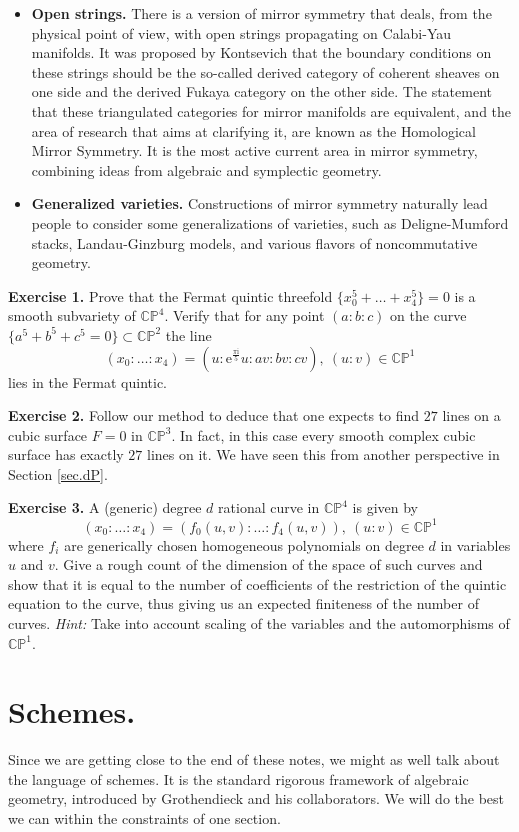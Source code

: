 \documentclass[11pt]{article}
\numberwithin{equation}{section}
\numberwithin{footnote}{section}
\newcommand{\blue}{\color{blue}}
\newcommand{\ee}{{\mathrm e}}
\newcommand{\ii}{{\mathrm i}}
\renewcommand{\P}{{\mathbb P}}
\newcommand{\C}{{\mathbb C}}
\begin{document}
\begin{itemize}
\item{\bf Open strings.} There is a version of mirror symmetry that deals, from the physical point of view, with open strings propagating on Calabi-Yau manifolds. It was proposed by Kontsevich that the boundary conditions on these strings should be the so-called derived category of coherent sheaves on one side and the derived Fukaya category on the other side. The statement that these triangulated categories for mirror manifolds are equivalent, and the area of research that aims at clarifying it, are known as the {\blue Homological Mirror Symmetry}. It is the most active current area in mirror symmetry, combining ideas from algebraic and symplectic geometry.

\item{\bf Generalized varieties.} Constructions of mirror symmetry naturally lead people to consider some generalizations of varieties, such as Deligne-Mumford stacks, Landau-Ginzburg models, and various flavors of noncommutative geometry.
\end{itemize}


{\bf Exercise 1.} Prove that the Fermat quintic threefold $\{x_0^5+ \ldots + x_4^5\}=0$ is a smooth subvariety of $\C\P^4$. Verify
that for any point $(a:b:c)$ on the curve $\{a^5+b^5+c^5 =0\}\subset \C\P^2$ the line
$$
(x_0:\ldots:x_4) = (u: \ee^{\frac {\pi \ii}5} u: a v: b v: cv),~(u:v)\in \C\P^1
$$
lies in the Fermat quintic.

{\bf Exercise 2.} Follow our method to deduce that one expects to find $27$ lines on a cubic surface $F=0$ in $\C\P^3$. In fact, in this case every smooth complex cubic surface has exactly $27$ lines on it. We have seen this from another perspective in Section \ref{sec.dP}.

{\bf Exercise 3.} A (generic) degree $d$ rational curve in $\C\P^4$ is given by 
$$
(x_0:\ldots:x_4) = (f_0(u,v):\ldots :f_4(u,v)),~(u:v)\in \C\P^1
$$
where $f_i$ are generically chosen homogeneous polynomials on degree $d$ in variables $u$ and $v$. Give a rough count of the dimension of the space of such curves and show that it is equal to the number of coefficients of the restriction of the quintic equation to the curve, thus giving us an expected finiteness of the number of curves.
\emph{Hint:} Take into account scaling of the variables and the automorphisms of $\C\P^1$.


\section{Schemes.}
Since we are getting close to the end of these notes, we might as well talk about the language of schemes. It is the standard rigorous 
framework of algebraic geometry, introduced by Grothendieck and his collaborators. We will do the best we can within the constraints of one section.
\end{document}
